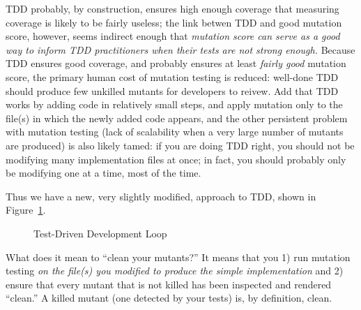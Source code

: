 \documentclass[sigplan,screen]{acmart}
\begin{document}
TDD probably, by construction, ensures high enough coverage that
measuring coverage is likely to be fairly useless; the link betwen TDD
and good mutation score, however, seems indirect enough that
\emph{mutation score can serve as a good way to inform TDD
  practitioners when their tests are not strong enough.}   Because TDD
ensures good coverage, and probably ensures at least \emph{fairly
  good} mutation score, the primary human cost of mutation testing is
reduced:  well-done TDD should produce few unkilled mutants for
developers to reivew.  Add that TDD works by adding code in relatively
small steps, and apply mutation only to the file(s) in which the newly
added code appears, and the other persistent problem with mutation testing (lack of
scalability when a very large number of mutants are produced) is also
likely tamed: if you are doing TDD right, you should not be modifying
many implementation files at once; in fact, you should probably only
be modifying one at a time, most of the time.

Thus we have a new, very slightly modified, approach to TDD, shown in
Figure~\ref{fig:mdd}.

\begin{figure}[h!]
  \centering
  \caption{Test-Driven Development Loop}
  \label{fig:mdd}
\end{figure}

What does it mean to ``clean your mutants?''  It means that you 1) run
mutation testing \emph{on the file(s) you modified to produce the
  simple implementation} and 2) ensure that every mutant that is not
killed has been inspected and rendered ``clean.''  A killed mutant
(one detected by your tests) is, by definition, clean.
\end{document}
